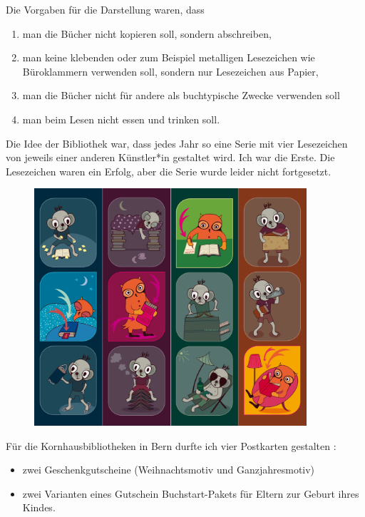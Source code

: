 \documentclass[a4paper,
fontsize=11pt,
oneside,
numbers=noperiodatend,
parskip=half-,
bibliography=totoc,
final
]{scrartcl}
\begin{document}
Die Vorgaben für die Darstellung waren, dass

\begin{enumerate}
\def\labelenumi{\arabic{enumi}.}
\item
  man die Bücher nicht kopieren soll, sondern abschreiben,
\item
  man keine klebenden oder zum Beispiel metalligen Lesezeichen wie
  Büroklammern verwenden soll, sondern nur Lesezeichen aus Papier,
\item
  man die Bücher nicht für andere als buchtypische Zwecke verwenden soll
\item
  man beim Lesen nicht essen und trinken soll.
\end{enumerate}

Die Idee der Bibliothek war, dass jedes Jahr so eine Serie mit vier
Lesezeichen von jeweils einer anderen Künstler*in gestaltet wird. Ich
war die Erste. Die Lesezeichen waren ein Erfolg, aber die Serie wurde
leider nicht fortgesetzt.

\begin{figure}[h!]
\centering
\includegraphics[width=0.9\textwidth]{img/image1.png}
\end{figure}

Für die Kornhausbibliotheken in Bern durfte ich vier Postkarten
gestalten :

\begin{itemize}
\item
  zwei Geschenkgutscheine (Weihnachtsmotiv und Ganzjahresmotiv)
\item
  zwei Varianten eines Gutschein Buchstart-Pakets für Eltern zur Geburt
  ihres Kindes.
\end{itemize}
\end{document}
